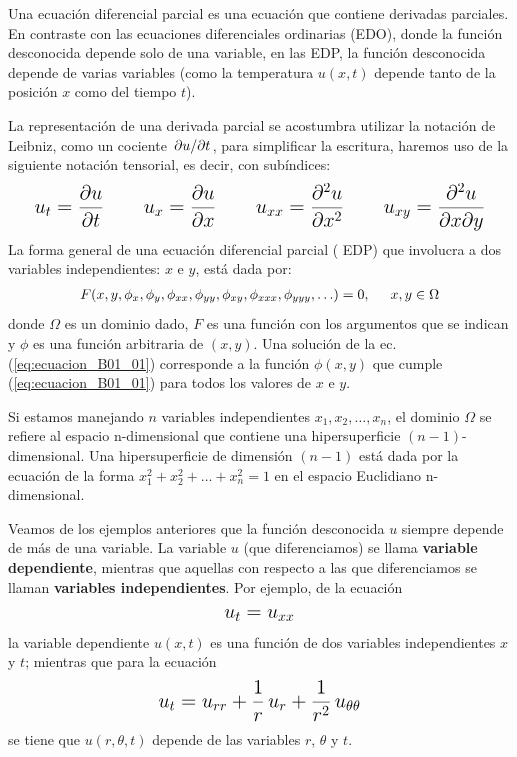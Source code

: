 Una ecuación diferencial parcial es una ecuación que contiene derivadas parciales. En contraste con las ecuaciones diferenciales ordinarias (EDO), donde la función desconocida depende solo de una variable, en las EDP, la función desconocida depende de varias variables (como la temperatura $u (x, t)$ depende tanto de la posición $x$ como del tiempo $t$).
\par
La representación de una derivada parcial se acostumbra utilizar la notación de Leibniz, como un cociente $\pdv*{u}{t}$, para simplificar la escritura, haremos uso de la siguiente notación tensorial, es decir, con subíndices:
\begin{align*}
\text{\Large{$
u_{t} = \pdv{u}{t} \hspace{1cm} u_{x} = \pdv{u}{x} \hspace{1cm} u_{xx} = \pdv[2]{u}{x} \hspace{1cm} u_{xy} = \pdv[2]{u}{x}{y}$}}
\end{align*}
La forma general de una ecuación diferencial parcial ( EDP) que involucra a dos variables independientes: $x$ e $y$, está dada por:
\begin{align}
F(x, y, \phi_{x}, \phi_{y}, \phi_{xx}, \phi_{yy}, \phi_{xy}, \phi_{xxx}, \phi_{yyy}, \ldots) = 0, \hspace{0.5cm} x, y \in \Omega
\label{eq:ecuacion_B01_01}
\end{align}
donde $\Omega$ es un dominio dado, $F$ es una función con los argumentos que se indican y $\phi$ es una función arbitraria de $(x, y)$. Una solución de la ec. (\ref{eq:ecuacion_B01_01}) corresponde a la función $\phi(x, y)$ que cumple (\ref{eq:ecuacion_B01_01}) para todos los valores de $x$ e $y$.
\par
Si estamos manejando $n$ variables independientes $x_{1}, x_{2}, \ldots, x_{n}$, el dominio $\Omega$ se refiere al espacio n-dimensional que contiene una hipersuperficie $(n-1)$-dimensional. Una hipersuperficie de dimensión $(n-1)$ está dada por la ecuación de la forma $x_{1}^{2} + x_{2}^{2} + \ldots + x_{n}^{2} = 1$ en el espacio Euclidiano n-dimensional.
\par
Veamos de los ejemplos anteriores que la función desconocida $u$ siempre depende de más de una variable. La variable $u$ (que diferenciamos) se llama \textbf{variable dependiente}, mientras que aquellas con respecto a las que diferenciamos se llaman \textbf{variables independientes}. Por ejemplo, de la ecuación
\begin{align*}
\text{\Large{$u_{t} = u_{xx}$}}
\end{align*}
la variable dependiente $u(x, t)$ es una función de dos variables independientes $x$ y $t$; mientras que para la ecuación
\begin{align*}
\text{\Large{$u_{t} = u_{rr} + \dfrac{1}{r} \, u_{r} + \dfrac{1}{r^{2}} \, u_{\theta \theta}$}}
\end{align*}
se tiene que $u(r, \theta, t)$ depende de las variables $r$, $\theta$ y $t$.

